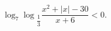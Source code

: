 \begin{ex}[type=inequality]
	\begin{condition}
		$\log_7 \log$\tiny$_{\dfrac{1}{3}}$\normalsize$\dfrac{x^2 + \big|x\big| - 30}{x + 6}<0  .$
	\end{condition}
\end{ex}